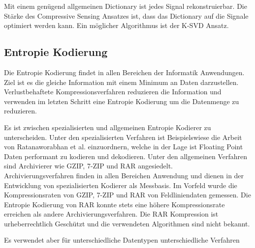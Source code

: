 Mit einem genügend allgemeinen Dictionary ist jedes Signal rekonstruierbar. Die Stärke des Compressive Sensing Ansatzes ist, dass das Dictionary auf die Signale optimiert werden kann. Ein möglicher Algorithmus ist der K-SVD \cite{bryt2008compression} Ansatz.

\subsection{Entropie Kodierung}
Die Entropie Kodierung findet in allen Bereichen der Informatik Anwendungen. Ziel ist es die gleiche Information mit einem Minimum an Daten darzustellen. Verlustbehaftete Kompressionsverfahren reduzieren die Information und verwenden im letzten Schritt eine Entropie Kodierung um die Datenmenge zu reduzieren.

Es ist zwischen spezialisierten und allgemeinen Entropie Kodierer zu unterscheiden. Unter den spezialisierten Verfahren ist Beispielswiese die Arbeit von Ratanaworabhan et al.\cite{ratanaworabhan2006fast} einzuordnern, welche in der Lage ist Floating Point Daten performant zu kodieren und dekodieren. 
Unter den allgemeinen Verfahren sind Archivierer wie GZIP\cite{website:gzip}, 7-ZIP\cite{website:7zip} und RAR\cite{website:rar} angesiedelt.\\ Archivierungsverfahren finden in allen Bereichen Anwendung und dienen in der Entwicklung von spezialisierten Kodierer als Messbasis. Im Vorfeld wurde die Kompressionsraten von GZIP, 7-ZIP und RAR von Feldliniendaten gemessen. Die Entropie Kodierung von RAR konnte stets eine höhere Kompressionsrate erreichen als andere Archivierungsverfahren. Die RAR Kompression ist urheberrechtlich Geschützt und die verwendeten Algorithmen sind nicht bekannt. 

Es verwendet aber für unterschiedliche Datentypen unterschiedliche Verfahren